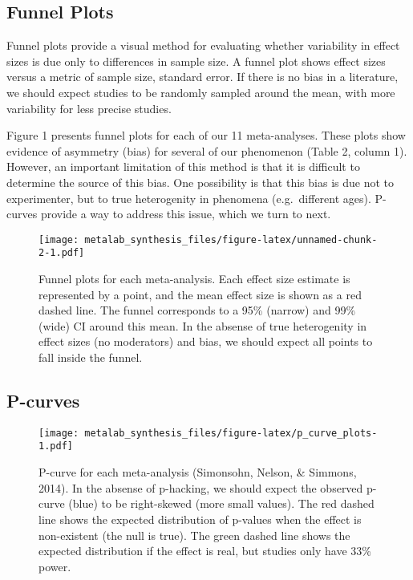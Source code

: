 \documentclass[american,floatsintext,man]{apa6}
\begin{document}
\subsection{Funnel Plots}\label{funnel-plots}

Funnel plots provide a visual method for evaluating whether variability
in effect sizes is due only to differences in sample size. A funnel plot
shows effect sizes versus a metric of sample size, standard error. If
there is no bias in a literature, we should expect studies to be
randomly sampled around the mean, with more variability for less precise
studies.

Figure 1 presents funnel plots for each of our 11 meta-analyses. These
plots show evidence of asymmetry (bias) for several of our phenomenon
(Table 2, column 1). However, an important limitation of this method is
that it is difficult to determine the source of this bias. One
possibility is that this bias is due not to experimenter, but to true
heterogenity in phenomena (e.g.~different ages). P-curves provide a way
to address this issue, which we turn to next.

\begin{figure}[htbp]
\centering
\texttt{[image: metalab\_synthesis\_files/figure-latex/unnamed-chunk-2-1.pdf]}
\caption{Funnel plots for each meta-analysis. Each effect size estimate
is represented by a point, and the mean effect size is shown as a red
dashed line. The funnel corresponds to a 95\% (narrow) and 99\% (wide)
CI around this mean. In the absense of true heterogenity in effect sizes
(no moderators) and bias, we should expect all points to fall inside the
funnel.}
\end{figure}

\subsection{P-curves}\label{p-curves}

\begin{figure}[htbp]
\centering
\texttt{[image: metalab\_synthesis\_files/figure-latex/p\_curve\_plots-1.pdf]}
\caption{P-curve for each meta-analysis (Simonsohn, Nelson, \& Simmons,
2014). In the absense of p-hacking, we should expect the observed
p-curve (blue) to be right-skewed (more small values). The red dashed
line shows the expected distribution of p-values when the effect is
non-existent (the null is true). The green dashed line shows the
expected distribution if the effect is real, but studies only have 33\%
power.}
\end{figure}
\end{document}

